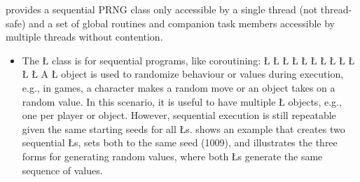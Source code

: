 \documentclass[openright,twoside]{report}
\begin{document}
\uC provides a sequential PRNG class only accessible by a single thread (not thread-safe) and a set of global routines and companion task members accessible by multiple threads without contention.
\begin{itemize}
\item
The \LGinlinetrue\LGbegin\lgrinde\L{}\endlgrinde\LGend{} class is for sequential programs, like coroutining:
\LGinlinefalse\LGbegin\lgrinde
\L{}
\L{\LB{}}
\CE{}\L{}
\L{\LB{}}
\CE{}\L{\LB{}}
\CE{}\L{\LB{}}
\CE{}\L{\LB{}}
\CE{}\L{\LB{}}
\CE{}\L{\LB{}\Tab{52}{\C{}\1\1\0[0,u)}}
\CE{}\L{\LB{}}
\CE{}\L{\LB{}}
\CE{}\L{\LB{\};}}
\endlgrinde\LGend
A \LGinlinetrue\LGbegin\lgrinde\L{}\endlgrinde\LGend{} object is used to randomize behaviour or values during execution, e.g., in games, a character makes a random move or an object takes on a random value.
In this scenario, it is useful to have multiple \LGinlinetrue\LGbegin\lgrinde\L{}\endlgrinde\LGend{} objects, e.g., one per player or object.
However, sequential execution is still repeatable given the same starting seeds for all \LGinlinetrue\LGbegin\lgrinde\L{}\endlgrinde\LGend{}s. 
 shows an example that creates two sequential \LGinlinetrue\LGbegin\lgrinde\L{}\endlgrinde\LGend{}s, sets both to the same seed (1009), and illustrates the three forms for generating random values, where both \LGinlinetrue\LGbegin\lgrinde\L{}\endlgrinde\LGend{}s generate the same sequence of values.


\end{itemize}
\end{document}
